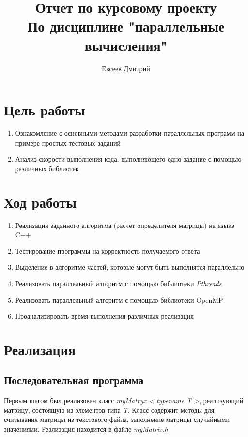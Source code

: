 \documentclass[10pt,a4paper]{report}
\author{Евсеев Дмитрий}
\title{Отчет по курсовому проекту\\
	По дисциплине "параллельные вычисления"}
\begin{document}
	\maketitle
	\tableofcontents
	\pagebreak
	
	\chapter{Цель работы}
	\begin{enumerate} 
		\item Ознакомление с основными методами разработки параллельных программ на примере простых тестовых заданий
		
		\item Анализ скорости выполнения кода, выполняющего одно задание с помощью различных библиотек
	\end{enumerate}
		
	\chapter{Ход работы}
	\begin{enumerate}
		\item Реализация заданного алгоритма (расчет определителя матрицы) на языке C++
		
		\item Тестирование программы на корректность получаемого ответа
		
		\item Выделение в алгоритме частей, которые могут быть выполнятся параллельно
		
		\item Реализовать параллельный алгоритм с помощью библиотеки \textit{Pthreads}
		
		\item Реализовать параллельный алгоритм с помощью библиотеки OpenMP
		
		\item Проанализировать время выполнения различных реализация  
	\end{enumerate}	
	
	\chapter{Реализация}
	\section{Последовательная программа}
	
	Первым шагом был реализован класс \textit{myMatryx < typename T >}, реализующий матрицу, состоящую из элементов типа \textit{T}. Класс содержит методы для считывания матрицы из текстового файла, заполнение матрицы случайными значениями. Реализация находится в файле \textit{myMatrix.h}
	
\end{document}
